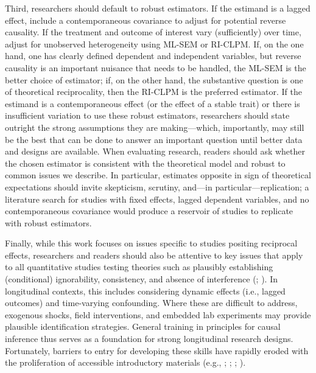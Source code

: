 \documentclass[
  letterpaper,
  DIV=11,
  numbers=noendperiod]{scrartcl}
\begin{document}
Third, researchers should default to robust estimators. If the estimand
is a lagged effect, include a contemporaneous covariance to adjust for
potential reverse causality. If the treatment and outcome of interest
vary (sufficiently) over time, adjust for unobserved heterogeneity using
ML-SEM or RI-CLPM. If, on the one hand, one has clearly defined
dependent and independent variables, but reverse causality is an
important nuisance that needs to be handled, the ML-SEM is the better
choice of estimator; if, on the other hand, the substantive question is
one of theoretical reciprocality, then the RI-CLPM is the preferred
estimator. If the estimand is a contemporaneous effect (or the effect of
a stable trait) or there is insufficient variation to use these robust
estimators, researchers should state outright the strong assumptions
they are making---which, importantly, may still be the best that can be
done to answer an important question until better data and designs are
available. When evaluating research, readers should ask whether the
chosen estimator is consistent with the theoretical model and robust to
common issues we describe. In particular, estimates opposite in sign of
theoretical expectations should invite skepticism, scrutiny, and---in
particular---replication; a literature search for studies with fixed
effects, lagged dependent variables, and no contemporaneous covariance
would produce a reservoir of studies to replicate with robust
estimators.

Finally, while this work focuses on issues specific to studies positing
reciprocal effects, researchers and readers should also be attentive to
key issues that apply to all quantitative studies testing theories such
as plausibly establishing (conditional) ignorability, consistency, and
absence of interference (; ). In
longitudinal contexts, this includes considering dynamic effects (i.e.,
lagged outcomes) and time-varying confounding. Where these are difficult
to address, exogenous shocks, field interventions, and embedded lab
experiments may provide plausible identification strategies. General
training in principles for causal inference thus serves as a foundation
for strong longitudinal research designs. Fortunately, barriers to entry
for developing these skills have rapidly eroded with the proliferation
of accessible introductory materials (e.g.,
;
;
;
).
\end{document}
